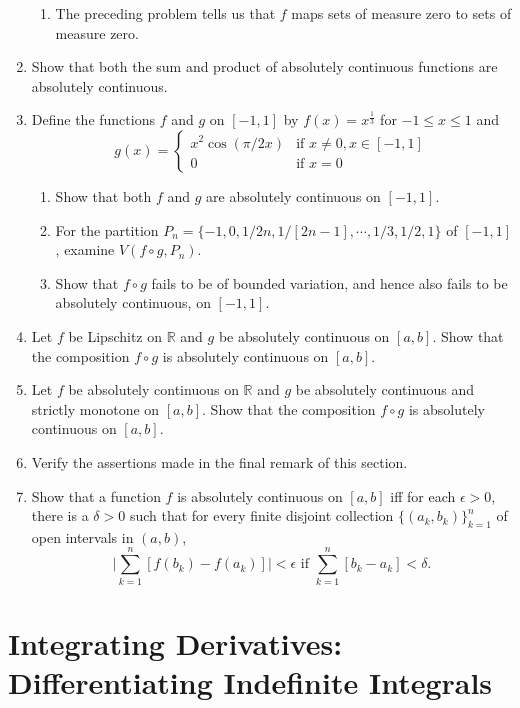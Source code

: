 \begin{enumerate}
\begin{enumerate}[label=(\roman*),align=left]
        \item The preceding problem tells us that $f$ maps sets of measure zero to sets of measure zero. 
    \end{enumerate}
    \item Show that both the sum and product of absolutely continuous functions are absolutely continuous.
    \item Define the functions $f$ and $g$ on $[-1,1]$ by $f(x)=x^{\frac{1}{3}}$ for $-1\le x\le 1$ and
    \[
        g(x)=
        \begin{cases}
            x^2\cos(\pi/2x)&\text{if }x\neq0,x\in[-1,1]\\
            0&\text{if }x=0
        \end{cases}  
    \]
    \begin{enumerate}[label=(\roman*),align=left]
        \item Show that both $f$ and $g$ are absolutely continuous on $[-1,1]$.
        \item For the partition $P_n=\{-1,0,1/2n,1/[2n-1],\cdots,1/3,1/2,1\}$ of $[-1,1]$, examine $V(f\circ g,P_n)$.
        \item Show that $f\circ g$ fails to be of bounded variation, and hence also fails to be absolutely continuous, on $[-1,1]$. 
    \end{enumerate}
    \item Let $f$ be Lipschitz on $\mathbb{R}$ and $g$ be absolutely continuous on $[a,b]$. Show that the composition $f \circ g$ is absolutely continuous on $[a,b]$.
    \item Let $f$ be absolutely continuous on $\mathbb{R}$ and $g$ be absolutely continuous and strictly monotone on $[a,b]$. Show that the composition $f\circ g$ is absolutely continuous on $[a,b]$.
    \item Verify the assertions made in the final remark of this section.
    \item Show that a function $f$ is absolutely continuous on $[a,b]$ iff for each $\epsilon>0$, there is a $\delta>0$ such that for every finite disjoint collection $\{(a_k,b_k)\}_{k=1}^n$ of open intervals in $(a,b)$,
    \[
        \biggl|\sum_{k=1}^n[f(b_k)-f(a_k)]\biggr|<\epsilon\text{ if }\sum_{k=1}^n[b_k-a_k]<\delta.  
    \]
\end{enumerate}

\section{Integrating Derivatives: Differentiating Indefinite Integrals}

